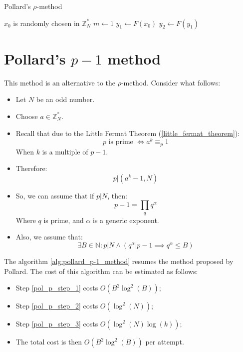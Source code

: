\begin{algorithm}
\caption{Pollard's $\rho$-method}\label{alg:pollard_rho_method}

$x_{0}$ is randomly chosen in $\mathbb{Z}_{N}^{*}$\;
$m \gets 1$\;
$y_{1} \gets F(x_{0})$\;
$y_{2} \gets F(y_{1})$\;
\end{algorithm}

\section{Pollard's $p - 1$ method}
This method is an alternative to the $\rho$-method. Consider what follows:
\begin{itemize}
    \item Let $N$ be an odd number.
    \item Choose $a \in \mathbb{Z}_{N}^{*}$.
    \item Recall that due to the Little Fermat Theorem (\ref{little_fermat_theorem}):
    \[
    p \text{ is prime } \iff a^{k} \equiv_{p} 1
    \]
    When $k$ is a multiple of $p-1$.
    \item Therefore:
    \[p | (a^{k} - 1, N)\]
    \item So, we can assume that if $p | N$, then:
    \[
    p - 1 = \prod_{q} q^{\alpha}
    \]
    Where $q$ is prime, and $\alpha$ is a generic exponent.
    \item Also, we assume that:
    \[\exists B \in \mathbb{N}: p | N \land (q^{\alpha}| p - 1 \implies q^{\alpha} \leq B)\]
\end{itemize}
 The algorithm \ref{alg:pollard_p-1_method} resumes the method proposed by Pollard. \newline
 The cost of this algorithm can be estimated as follows:
 \begin{itemize}
     \item Step \ref{pol_p_step_1} costs $O(B^{2} \operatorname{log}^{2}(B))$;
     \item Step \ref{pol_p_step_2} costs $O(\operatorname{log}^{2}(N))$;
     \item Step \ref{pol_p_step_3} costs $O(\operatorname{log}^{2}(N)\operatorname{log}(k))$;
     \item The total cost is then $O(B^{2} \operatorname{log}^{2}(B))$ per attempt.
 \end{itemize}

